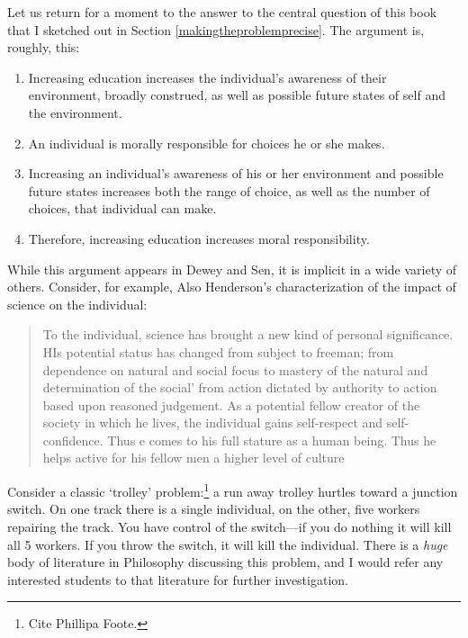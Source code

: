 Let us return for a moment to the answer to the central question of this book that I sketched out in Section \ref{makingtheproblemprecise}. The argument is, roughly, this:

\begin{enumerate}
\item Increasing education increases the individual's awareness of their environment, broadly construed, as well as possible future states of self and the environment.

\item An individual is morally responsible for choices he or she makes.

\item Increasing an individual's awareness of his or her environment and possible future states increases both the range of choice, as well as the number of choices, that individual can make.

\item Therefore, increasing education increases moral responsibility.

\end{enumerate}

While this argument appears in Dewey and Sen, it is implicit in a wide variety of others. Consider, for example, Also Henderson's characterization of the impact of science on the individual:

\begin{quote}

To the individual, science has brought a new kind of personal significance. HIs potential status has changed from subject to freeman; from dependence on natural and social focus to mastery of the natural and determination of the social' from action dictated by authority to action based upon reasoned judgement. As a potential fellow creator of the society in which he lives, the individual gains self-respect and self-confidence. Thus e comes to his full stature as a human being. Thus he helps active for his fellow men a higher level of culture ~\citep[p.46]{Henderson:1944vw}
\end{quote}

Consider a classic `trolley' problem:\footnote{Cite Phillipa Foote.} a run away trolley hurtles toward a junction switch. On one track there is a single individual, on the other, five workers repairing the track. You have control of the switch---if you do nothing it will kill all 5 workers. If you throw the switch, it will kill the individual. There is a \emph{huge} body of literature in Philosophy discussing this problem, and I would refer any interested students to that literature for further investigation.

